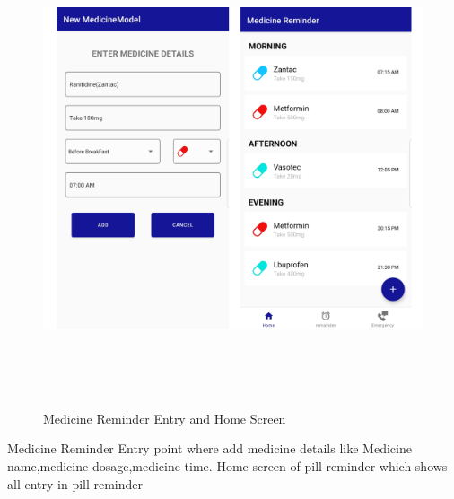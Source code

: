 {\begin{figure}[H]
\begin{center}
\includegraphics[width=155mm, height = 140mm]{Outputnew/4.png}
\caption{Medicine Reminder Entry and Home Screen}
\end{center}
\end{figure}

Medicine Reminder Entry point where add medicine details like Medicine name,medicine dosage,medicine time. Home screen of pill reminder which shows all entry in pill reminder


}
